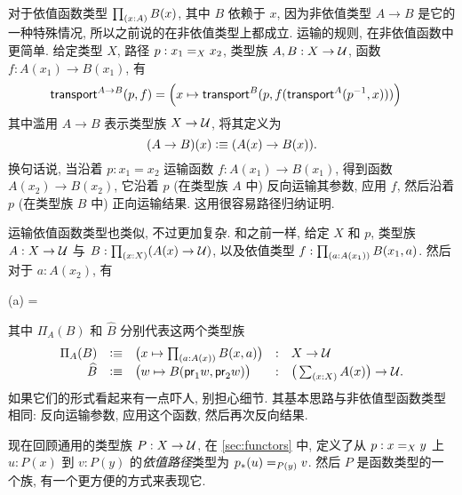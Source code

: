 对于依值函数类型 $\prd{x:A} B(x)$, 其中 $B$ 依赖于 $x$, 因为非依值类型 $A\to B$ 是它的一种特殊情况, 所以之前说的在非依值类型上都成立.
%
运输的规则, 在非依值函数中更简单.
给定类型 $X$, 路径 $p:\id[X]{x_1}{x_2}$, 类型族 $A,B:X\to \type$, 函数 $f : A(x_1) \to B(x_1)$, 有
\begin{align}
    \label{eq:transport-arrow}
    \transfib{A\to B}{p}{f} &=
    \Big(x \mapsto \transfib{B}{p}{f(\transfib{A}{\opp p}{x})}\Big)
\end{align}
其中滥用 $A\to B$ 表示类型族 $X\to \type$, 将其定义为
\[
    (A\to B)(x) \defeq (A(x)\to B(x)).
\]
换句话说, 当沿着 $p:x_1=x_2$ 运输函数 $f:A(x_1)\to B(x_1)$, 得到函数 $A(x_2)\to B(x_2)$, 它沿着 $p$ (在类型族 $A$ 中) 反向运输其参数, 应用 $f$, 然后沿着 $p$ (在类型族 $B$ 中) 正向运输结果.
这用很容易路径归纳证明.

%
运输依值函数类型也类似, 不过更加复杂.
和之前一样, 给定 $X$ 和 $p$, 类型族 $A:X\to \type$ 与 $B:\prd{x:X} (A(x)\to\type)$, 以及依值类型 $f : \prd{a:A(x_1)} B(x_1,a)$.
然后对于 $a:A(x_2)$, 有
\begin{narrowmultline*}
    (a) = \narrowbreak
\end{narrowmultline*}
其中 $\Pi_A(B)$ 和 $\widehat{B}$ 分别代表这两个类型族
\begin{equation}
    \label{eq:transport-arrow-families}
    \begin{array}{rclcl}
        \Pi_A(B)    & \defeq & \big(x\mapsto \prd{a:A(x)} B(x,a) \big) & : & X\to \type                         \\
        \widehat{B} & \defeq & \big(w \mapsto B(\proj1w,\proj2w) \big) & : & \big(\sm{x:X} A(x)\big) \to \type.
    \end{array}
\end{equation}
如果它们的形式看起来有一点吓人, 别担心细节.
其基本思路与非依值型函数类型相同: 反向运输参数, 应用这个函数, 然后再次反向结果.

现在回顾通用的类型族 $P:X\to\type$, 在 \cref{sec:functors} 中, 定义了从 $p:\id[X]xy$ 上 $u:P(x)$ 到 $v:P(y)$ 的\emph{依值路径}类型为 $\id[P(y)]{\trans{p}{u}}{v}$.
然后 $P$ 是函数类型的一个族, 有一个更方便的方式来表现它.

